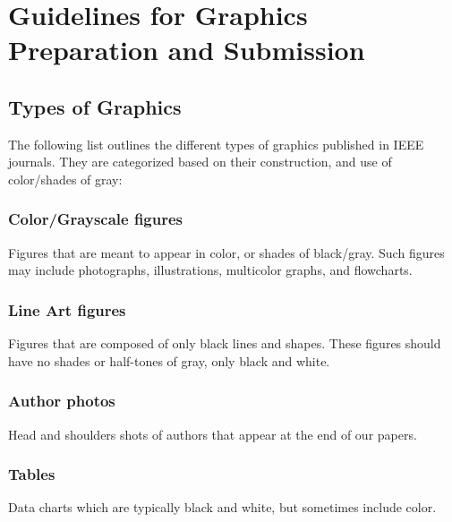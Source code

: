\section{Guidelines for Graphics Preparation and Submission}
\label{sec:guidelines}

\subsection{Types of Graphics}
The following list outlines the different types of graphics published in 
IEEE journals. They are categorized based on their construction, and use of 
color/shades of gray:

\subsubsection{Color/Grayscale figures}
{Figures that are meant to appear in color, or shades of black/gray. Such 
figures may include photographs, illustrations, multicolor graphs, and 
flowcharts.}

\subsubsection{Line Art figures}
{Figures that are composed of only black lines and shapes. These figures 
should have no shades or half-tones of gray, only black and white.}

\subsubsection{Author photos}
{Head and shoulders shots of authors that appear at the end of our papers. }

\subsubsection{Tables}
{Data charts which are typically black and white, but sometimes include 
color.}

